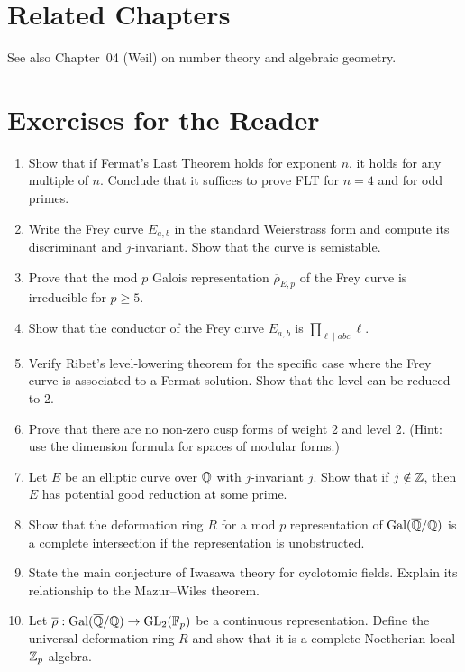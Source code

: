 \section{Related Chapters}
See also Chapter~04 (Weil) on number theory and algebraic geometry.

\section*{Exercises for the Reader}

\begin{enumerate}
    \item [B] Show that if Fermat's Last Theorem holds for exponent \(n\), it holds for any multiple of \(n\). Conclude that it suffices to prove FLT for \(n = 4\) and for odd primes.
    \item [I] Write the Frey curve \(E_{a,b}\) in the standard Weierstrass form and compute its discriminant and \(j\)-invariant. Show that the curve is semistable.
    \item [I] Prove that the mod \(p\) Galois representation \(\overline{\rho}_{E,p}\) of the Frey curve is irreducible for \(p \geq 5\).
    \item [I] Show that the conductor of the Frey curve \(E_{a,b}\) is \(\prod_{\ell \mid abc} \ell\).
    \item [A] Verify Ribet's level-lowering theorem for the specific case where the Frey curve is associated to a Fermat solution. Show that the level can be reduced to 2.
    \item [B] Prove that there are no non-zero cusp forms of weight 2 and level 2. (Hint: use the dimension formula for spaces of modular forms.)
    \item [I] Let \(E\) be an elliptic curve over \(\mathbb{Q}\) with \(j\)-invariant \(j\). Show that if \(j \notin \mathbb{Z}\), then \(E\) has potential good reduction at some prime.
    \item [I] Show that the deformation ring \(R\) for a mod \(p\) representation of \(\operatorname{Gal}(\overline{\mathbb{Q}}/\mathbb{Q})\) is a complete intersection if the representation is unobstructed.
    \item [I] State the main conjecture of Iwasawa theory for cyclotomic fields. Explain its relationship to the Mazur--Wiles theorem.
    \item [I] Let \(\overline{\rho}: \operatorname{Gal}(\overline{\mathbb{Q}}/\mathbb{Q}) \to \operatorname{GL}_2(\mathbb{F}_p)\) be a continuous representation. Define the universal deformation ring \(R\) and show that it is a complete Noetherian local \(\mathbb{Z}_p\)-algebra.

\end{enumerate}
